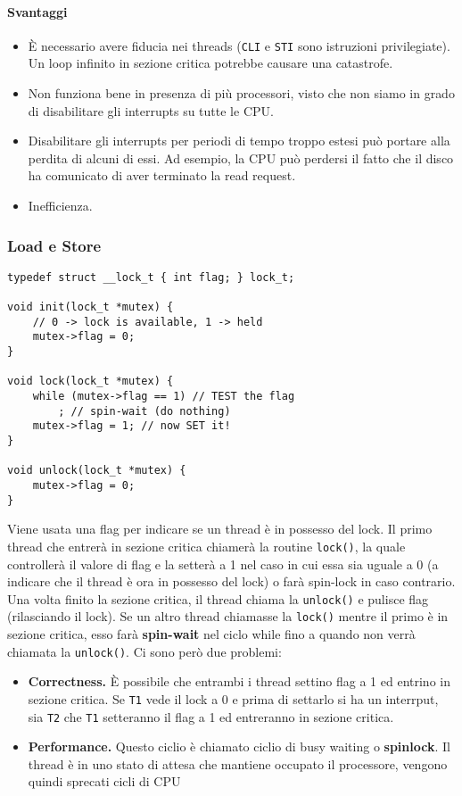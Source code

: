 \documentclass[12pt, letterpaper]{article}
\begin{document}
				\paragraph{Svantaggi}
					\begin{itemize}
						\item È necessario avere fiducia nei threads (\texttt{CLI} e \texttt{STI} sono istruzioni privilegiate). Un loop infinito in sezione critica potrebbe causare una catastrofe.
						\item Non funziona bene in presenza di più processori, visto che non siamo in grado di disabilitare gli interrupts su tutte le CPU.
						\item Disabilitare gli interrupts per periodi di tempo troppo estesi può portare alla perdita di alcuni di essi. Ad esempio, la CPU può perdersi il fatto che il disco ha comunicato di aver terminato la read request.
						\item Inefficienza.	
					\end{itemize}
			\subsubsection{Load e Store}
				\begin{lstlisting}[style=CStyle]
typedef struct __lock_t { int flag; } lock_t;

void init(lock_t *mutex) {
	// 0 -> lock is available, 1 -> held
	mutex->flag = 0;
}

void lock(lock_t *mutex) {
	while (mutex->flag == 1) // TEST the flag
		; // spin-wait (do nothing)
	mutex->flag = 1; // now SET it!
}

void unlock(lock_t *mutex) {
	mutex->flag = 0;
}				\end{lstlisting}
				Viene usata una flag per indicare se un thread è in possesso del lock. Il primo thread che entrerà in sezione critica chiamerà la routine \texttt{lock()}, la quale controllerà il valore di flag e la setterà a 1 nel caso in cui essa sia uguale a 0 (a indicare che il thread è ora in possesso del lock) o farà spin-lock in caso contrario. Una volta finito la sezione critica, il thread chiama la \texttt{unlock()} e pulisce flag (rilasciando il lock). Se un altro thread chiamasse la \texttt{lock()} mentre il primo è in sezione critica, esso farà \textbf{spin-wait} nel ciclo while fino a quando non verrà chiamata la \texttt{unlock()}. Ci sono però due problemi:
				\begin{itemize}
					\item \textbf{Correctness.} È possibile che entrambi i thread settino flag a 1 ed entrino in sezione critica. Se \texttt{T1} vede il lock a 0 e prima di settarlo si ha un interrput, sia \texttt{T2} che \texttt{T1} setteranno il flag a 1 ed entreranno in sezione critica.
					\item \textbf{Performance.} Questo ciclio è chiamato ciclio di busy waiting o \textbf{spinlock}. Il thread è in uno stato di attesa che mantiene occupato il processore, vengono quindi sprecati cicli di CPU
				\end{itemize}
				
\end{document}
